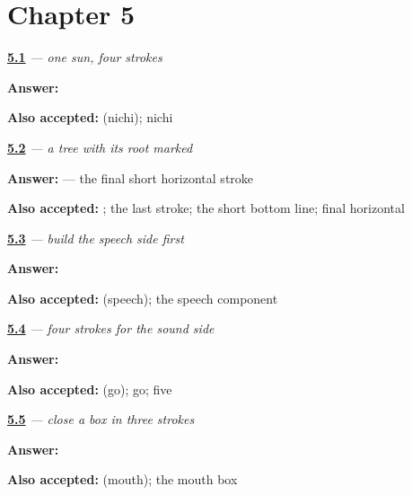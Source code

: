 \section*{Chapter 5}

\noindent\begin{minipage}[t]{\linewidth}
\raggedright
\hyperlink{review-JA-W05-nichi-kanji-four-strokes}{\textbf{5.1}} \emph{ — one sun, four strokes}\par
\small \textbf{Answer:} \par
\footnotesize \textbf{Also accepted:}  (nichi); nichi
\end{minipage}\par\medskip

\noindent\begin{minipage}[t]{\linewidth}
\raggedright
\hyperlink{review-JA-W05-hon-kanji-root-mark}{\textbf{5.2}} \emph{ — a tree with its root marked}\par
\small \textbf{Answer:}  — the final short horizontal stroke\par
\footnotesize \textbf{Also accepted:} ; the last stroke; the short bottom line; final horizontal
\end{minipage}\par\medskip

\noindent\begin{minipage}[t]{\linewidth}
\raggedright
\hyperlink{review-JA-W05-gen-component-speech-side}{\textbf{5.3}} \emph{ — build the speech side first}\par
\small \textbf{Answer:} \par
\footnotesize \textbf{Also accepted:}  (speech); the speech component
\end{minipage}\par\medskip

\noindent\begin{minipage}[t]{\linewidth}
\raggedright
\hyperlink{review-JA-W05-five-component-four-strokes}{\textbf{5.4}} \emph{ — four strokes for the sound side}\par
\small \textbf{Answer:} \par
\footnotesize \textbf{Also accepted:}  (go); go; five
\end{minipage}\par\medskip

\noindent\begin{minipage}[t]{\linewidth}
\raggedright
\hyperlink{review-JA-W05-mouth-component-close-box}{\textbf{5.5}} \emph{ — close a box in three strokes}\par
\small \textbf{Answer:} \par
\footnotesize \textbf{Also accepted:}  (mouth); the mouth box
\end{minipage}\par\medskip

